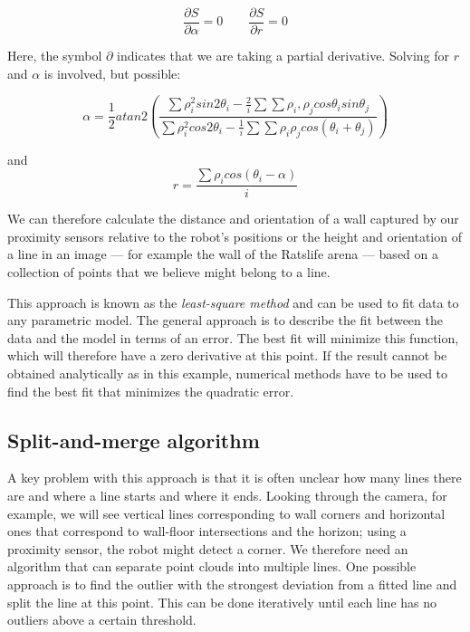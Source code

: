 \begin{equation}
\frac{\partial{S}}{\partial{\alpha}}=0 \qquad \frac{\partial{S}}{\partial{r}}=0
\end{equation}

Here, the symbol $ \partial$ indicates that we are taking a partial derivative. Solving for $r$ and $\alpha$ is involved, but possible:

\begin{equation}
\alpha=\frac{1}{2}atan2\left(\frac{\sum{\rho_i^2 sin 2\theta_i}-\frac{2}{i}\sum{\sum{\rho_i,\rho_j cos \theta_i sin \theta_j}}}{\sum{\rho_i^2 cos 2 \theta_i - \frac{1}{i}\sum{\sum{\rho_i \rho_j cos(\theta_i+\theta_j)}}}}\right)
\end{equation}

and
\begin{equation}
r=\frac{\sum \rho_i cos (\theta_i-\alpha)}{i}
\end{equation}

We can therefore calculate the distance and orientation of a wall captured by our proximity sensors relative to the robot's positions or the height and orientation of a line in an image --- for example the wall of the Ratslife arena --- based on a collection of points that we believe might belong to a line.

This approach is known as the \emph{least-square method} and can be used to fit data to any parametric model. The general approach is to describe the fit between the data and the model in terms of an error. The best fit will minimize this function, which will therefore have a zero derivative at this point. If the result cannot be obtained analytically as in this example, numerical methods have to be used to find the best fit that minimizes the quadratic error.

\subsection{Split-and-merge algorithm}
A key problem with this approach is that it is often unclear how many lines there are and where a line starts and where it ends. Looking through the camera, for example, we will see vertical lines corresponding to wall corners and horizontal ones that correspond to wall-floor intersections and the horizon; using a proximity sensor, the robot might detect a corner. We therefore need an algorithm that can separate point clouds into multiple lines. One possible approach is to find the outlier with the strongest deviation from a fitted line and split the line at this point. This can be done iteratively until each line has no outliers above a certain threshold. 

